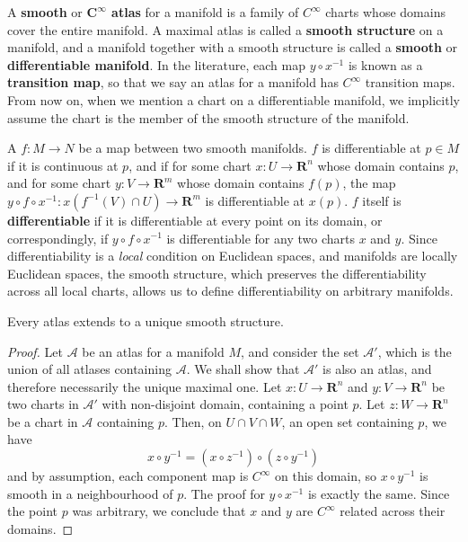 A {\bf smooth} or {\bf $\mathbf{C^\infty}$ atlas} for a manifold is a family of $C^\infty$ charts whose domains cover the entire manifold. A maximal atlas is called a {\bf smooth structure} on a manifold, and a manifold together with a smooth structure is called a {\bf smooth} or {\bf differentiable manifold}. In the literature, each map $y \circ x^{-1}$ is known as a {\bf transition map}, so that we say an atlas for a manifold has $C^\infty$ transition maps. From now on, when we mention a chart on a differentiable manifold, we implicitly assume the chart is the member of the smooth structure of the manifold.

A $f:M \to N$ be a map between two smooth manifolds. $f$ is differentiable at $p \in M$ if it is continuous at $p$, and if for some chart $x:U \to \mathbf{R}^n$ whose domain contains $p$, and for some chart $y:V \to \mathbf{R}^m$ whose domain contains $f(p)$, the map $y \circ f \circ x^{-1}:x(f^{-1}(V) \cap U) \to \mathbf{R}^m$ is differentiable at $x(p)$. $f$ itself is {\bf differentiable} if it is differentiable at every point on its domain, or correspondingly, if $y \circ f \circ x^{-1}$ is differentiable for any two charts $x$ and $y$. Since differentiability is a {\it local} condition on Euclidean spaces, and manifolds are locally Euclidean spaces, the smooth structure, which preserves the differentiability across all local charts, allows us to define differentiability on arbitrary manifolds.

\begin{lemma}
    Every atlas extends to a unique smooth structure.
\end{lemma}
\begin{proof}
Let $\mathcal{A}$ be an atlas for a manifold $M$, and consider the set $\mathcal{A}'$, which is the union of all atlases containing $\mathcal{A}$. We shall show that $\mathcal{A}'$ is also an atlas, and therefore necessarily the unique maximal one. Let $x:U \to \mathbf{R}^n$ and $y:V \to \mathbf{R}^n$ be two charts in $\mathcal{A}'$ with non-disjoint domain, containing a point $p$. Let $z:W \to \mathbf{R}^n$ be a chart in $\mathcal{A}$ containing $p$. Then, on $U \cap V \cap W$, an open set containing $p$, we have
%
\[ x \circ y^{-1} = (x \circ z^{-1}) \circ (z \circ y^{-1}) \]
%
and by assumption, each component map is $C^\infty$ on this domain, so $x \circ y^{-1}$ is smooth in a neighbourhood of $p$. The proof for $y \circ x^{-1}$ is exactly the same. Since the point $p$ was arbitrary, we conclude that $x$ and $y$ are $C^\infty$ related across their domains.
\end{proof}

